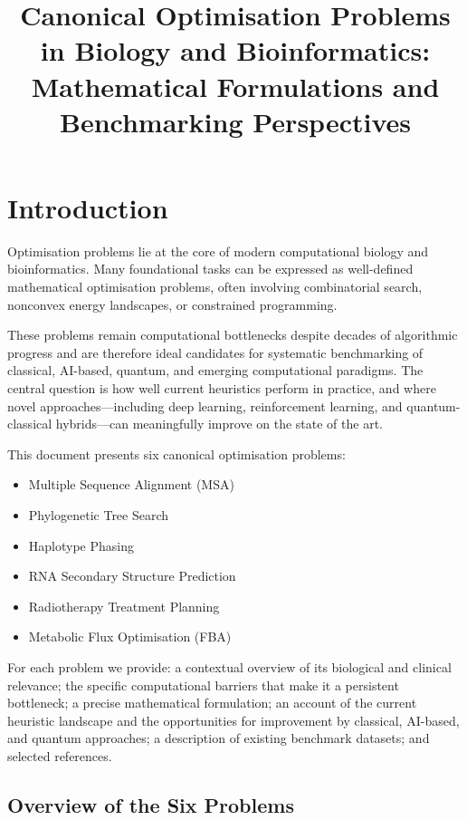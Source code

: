 \documentclass[11pt]{article}
\title{Canonical Optimisation Problems in Biology and Bioinformatics:\\
Mathematical Formulations and Benchmarking Perspectives}
\author{}
\date{}
\begin{document}
\maketitle

\section*{Introduction}

Optimisation problems lie at the core of modern computational biology and bioinformatics.
Many foundational tasks can be expressed as well-defined mathematical optimisation problems,
often involving combinatorial search, nonconvex energy landscapes, or constrained programming.

These problems remain computational bottlenecks despite decades of algorithmic progress and
are therefore ideal candidates for systematic benchmarking of classical, AI-based, quantum,
and emerging computational paradigms. The central question is how well current heuristics
perform in practice, and where novel approaches---including deep learning, reinforcement
learning, and quantum-classical hybrids---can meaningfully improve on the state of the art.

This document presents six canonical optimisation problems:

\begin{itemize}[noitemsep]
    \item Multiple Sequence Alignment (MSA)
    \item Phylogenetic Tree Search
    \item Haplotype Phasing
    \item RNA Secondary Structure Prediction
    \item Radiotherapy Treatment Planning
    \item Metabolic Flux Optimisation (FBA)
\end{itemize}

For each problem we provide: a contextual overview of its biological and clinical relevance;
the specific computational barriers that make it a persistent bottleneck;
a precise mathematical formulation; an account of the current heuristic landscape 
and the opportunities for improvement by classical, AI-based, and quantum approaches;
a description of existing benchmark datasets; and selected references.

\subsection*{Overview of the Six Problems}
\end{document}
